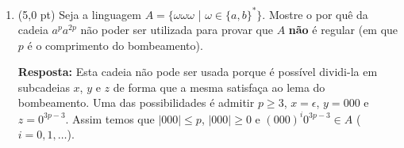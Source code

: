 \documentclass[12pt,a4paper,oneside]{article}
\begin{document}
\begin{enumerate}
	\vspace*{0.5cm}
	
	\item (5,0 pt) Seja a linguagem $A = \{\omega \omega \omega$ | $\omega \in \{a,b\}^*\}$. Mostre o por quê da cadeia $a^pa^{2p}$ não poder ser utilizada para provar que $A$ {\bf não} é regular (em que $p$ é o comprimento do bombeamento).
	
	\vspace*{0.3cm}
	
	{\color{blue} {\bf Resposta:} Esta cadeia não pode ser usada porque é possível dividi-la em subcadeias $x$, $y$ e $z$ de forma que a mesma satisfaça ao lema do bombeamento. Uma das possibilidades é admitir $p \geq 3$, $x=\epsilon$, $y=000$ e $z=0^{3p-3}$. Assim temos que $|000| \leq p$, $|000| \geq 0$ e $(000)^i0^{3p-3} \in A$ ($i=0, 1, \ldots$).
	}

\end{enumerate}
\end{document}
